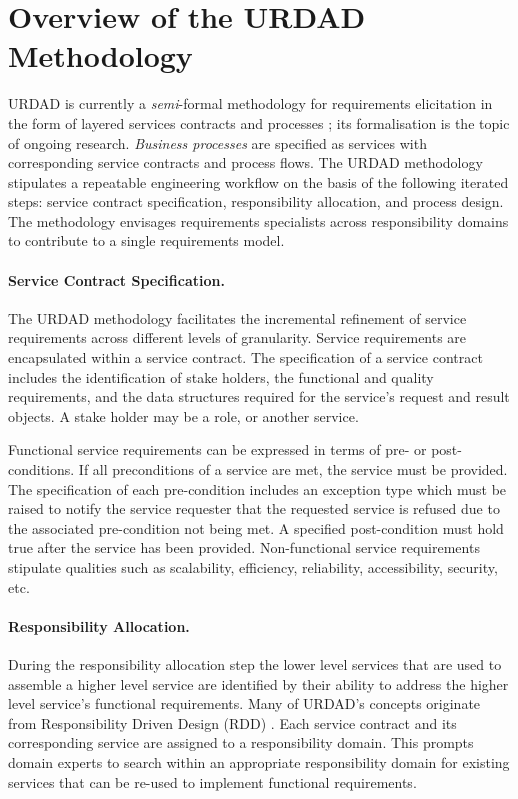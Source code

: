 \section{Overview of the URDAD Methodology 
\label{sec:urdadMethodology}}

URDAD is currently a \emph{semi}-formal methodology for requirements elicitation in the form of layered services contracts and processes  \cite{solms_urdad_2010}; its formalisation is the topic of ongoing research. \emph{Business processes} are specified as services with corresponding service contracts and process flows. The URDAD methodology stipulates a repeatable engineering workflow on the basis of the following iterated steps: service contract specification, responsibility allocation, and process design. The methodology envisages requirements specialists across responsibility domains to contribute to a single requirements model.

\paragraph{Service Contract Specification.} The URDAD methodology facilitates the incremental refinement of service requirements across different levels of granularity. Service requirements are encapsulated within a service contract. The specification of a service contract includes the identification of stake holders, the functional and quality requirements, and the data structures required for the service's request and result objects. A stake holder may be a role, or another service.

Functional service requirements can be expressed in terms of pre- or post-conditions. If all preconditions of a service are met, the service must be provided. The specification of each pre-condition includes an exception type which must be raised to notify the service requester that the requested service is refused due to the associated pre-condition not being met. A specified post-condition must hold true after the service has been provided. Non-functional service requirements stipulate qualities such as scalability, efficiency, reliability, accessibility, security, etc.

\paragraph{Responsibility Allocation.} During the responsibility allocation step the lower level services that are used to assemble a higher level service are identified by their ability to address the higher level service's functional requirements. Many of URDAD's concepts originate from Responsibility Driven Design (RDD) \cite{wirfs-brock_object-oriented_1989,wirfs-brock_object_2002}. Each service contract and its corresponding service are assigned to a responsibility domain. This prompts domain experts to search within an appropriate responsibility domain for existing services that can be re-used to implement functional requirements.

